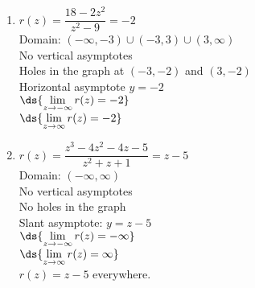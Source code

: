 \documentclass{ximera}
\begin{document}
\begin{multicols}{2}
\begin{enumerate}
\setcounter{enumi}{\value{HW}}

\item $r(z) = \dfrac{18-2z^2}{z^2-9} = -2$\\
Domain: $(-\infty, -3) \cup (-3,3) \cup (3, \infty)$\\
No vertical asymptotes \\
Holes in the graph at $(-3,-2)$ and $(3,-2)$ \\
Horizontal asymptote $y = -2$ \\
$\ds{\lim_{z \rightarrow   - \infty} r(z)  = -2}$ \\
$\ds{\lim_{z \rightarrow    \infty} r(z)  = -2}$ \\

\vfill
\columnbreak

\item $r(z) = \dfrac{z^3-4z^2-4z-5}{z^2+z+1} = z-5$\\
Domain: $(-\infty, \infty)$\\
No vertical asymptotes \\
No holes in the graph \\
Slant asymptote:  $y = z-5$ \\
$\ds{\lim_{z \rightarrow -\infty} r(z) = -\infty}$\\
$\ds{\lim_{z \rightarrow \infty} r(z) = \infty}$\\
$r(z) = z-5$ everywhere. \\
\setcounter{HW}{\value{enumi}}
\end{enumerate}
\end{multicols}
\end{document}
